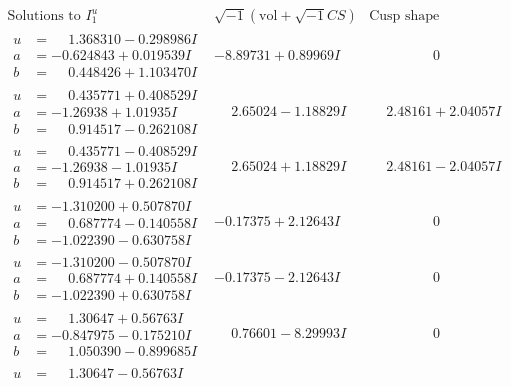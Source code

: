 \documentclass[1p]{elsarticle_modified}
\theoremstyle{definition}
\newcommand{\I}{\sqrt{-1}}
\begin{document}
$$\begin{array}{c|c|c}
\text{Solutions to }I^u_{1}& \I (\text{vol} + \sqrt{-1}CS) & \text{Cusp shape}\\
 \hline 
\begin{aligned}
u &= \phantom{-}1.368310 - 0.298986 I \\
a &= -0.624843 + 0.019539 I \\
b &= \phantom{-}0.448426 + 1.103470 I\end{aligned}
 & -8.89731 + 0.89969 I & \phantom{-0.000000 } 0 \\ \hline\begin{aligned}
u &= \phantom{-}0.435771 + 0.408529 I \\
a &= -1.26938 + 1.01935 I \\
b &= \phantom{-}0.914517 - 0.262108 I\end{aligned}
 & \phantom{-}2.65024 - 1.18829 I & \phantom{-}2.48161 + 2.04057 I \\ \hline\begin{aligned}
u &= \phantom{-}0.435771 - 0.408529 I \\
a &= -1.26938 - 1.01935 I \\
b &= \phantom{-}0.914517 + 0.262108 I\end{aligned}
 & \phantom{-}2.65024 + 1.18829 I & \phantom{-}2.48161 - 2.04057 I \\ \hline\begin{aligned}
u &= -1.310200 + 0.507870 I \\
a &= \phantom{-}0.687774 - 0.140558 I \\
b &= -1.022390 - 0.630758 I\end{aligned}
 & -0.17375 + 2.12643 I & \phantom{-0.000000 } 0 \\ \hline\begin{aligned}
u &= -1.310200 - 0.507870 I \\
a &= \phantom{-}0.687774 + 0.140558 I \\
b &= -1.022390 + 0.630758 I\end{aligned}
 & -0.17375 - 2.12643 I & \phantom{-0.000000 } 0 \\ \hline\begin{aligned}
u &= \phantom{-}1.30647 + 0.56763 I \\
a &= -0.847975 - 0.175210 I \\
b &= \phantom{-}1.050390 - 0.899685 I\end{aligned}
 & \phantom{-}0.76601 - 8.29993 I & \phantom{-0.000000 } 0 \\ \hline\begin{aligned}
u &= \phantom{-}1.30647 - 0.56763 I \\

\end{aligned}
\end{array}$$
\end{document}
